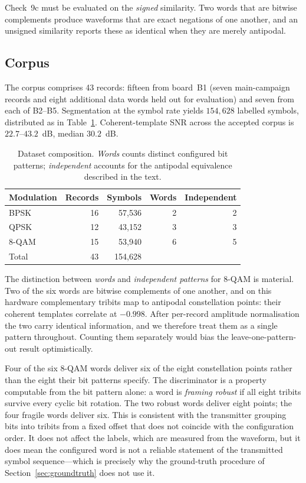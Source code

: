 \documentclass[journal]{IEEEtran}   %
\begin{document}
Check~9c must be evaluated on the \emph{signed} similarity. Two words that are
bitwise complements produce waveforms that are exact negations of one another,
and an unsigned similarity reports these as identical when they are merely
antipodal.

\subsection{Corpus}
The corpus comprises 43 records: fifteen from board~B1 (seven main-campaign
records and eight additional data words held out for evaluation) and seven from
each of B2--B5. Segmentation at the symbol rate yields $154{,}628$ labelled
symbols, distributed as in Table~\ref{tab:dataset}. Coherent-template SNR across
the accepted corpus is $22.7$--$43.2$~dB, median $30.2$~dB.

\begin{table}[!t]
\caption{Dataset composition. \emph{Words} counts distinct configured bit
patterns; \emph{independent} accounts for the antipodal equivalence described in the text.
}
\label{tab:dataset}
\centering
\begin{tabular}{lrrrr}
\toprule
Modulation & Records & Symbols & Words & Independent \\
\midrule
BPSK  & 16 & 57{,}536 & 2 & 2 \\
QPSK  & 12 & 43{,}152 & 3 & 3 \\
8-QAM & 15 & 53{,}940 & 6 & 5 \\
\midrule
Total & 43 & 154{,}628 & & \\
\bottomrule
\end{tabular}
\end{table}

The distinction between \emph{words} and \emph{independent patterns} for 8-QAM is
material. Two of the six words are bitwise complements of one another, and on
this hardware complementary tribits map to antipodal constellation points: their
coherent templates correlate at $-0.998$. After per-record amplitude
normalisation the two carry identical information, and we therefore treat them
as a single pattern throughout. Counting them separately would bias the
leave-one-pattern-out result optimistically.

Four of the six 8-QAM words deliver six of the eight constellation points rather
than the eight their bit patterns specify. The discriminator is a property
computable from the bit pattern alone: a word is \emph{framing robust} if all
eight tribits survive every cyclic bit rotation. The two robust words deliver
eight points; the four fragile words deliver six. This is consistent with the
transmitter grouping bits into tribits from a fixed offset that does not
coincide with the configuration order. It does not affect the labels, which are
measured from the waveform, but it does mean the configured word is not a
reliable statement of the transmitted symbol sequence---which is precisely why
the ground-truth procedure of Section~\ref{sec:groundtruth} does not use it.
\end{document}
